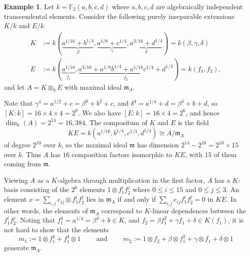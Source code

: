 \documentclass[11pt,reqno]{amsart}
\theoremstyle{definition}
\newtheorem{example}[lemma]{Example}
\theoremstyle{remark}
\theoremstyle{definition}
\theoremstyle{plain}
\newcommand{\F}{\mathbb{F}}
\newcommand{\m}{\mathfrak{m}}
\begin{document}
\begin{example}\label{ex:finally}
Let $k=\F_2(a,b,c,d)$ where $a,b,c,d$ are algebraically independent transcendental elements.
Consider the following purely inseparable extensions $K/k$ and $E/k$
\begin{align*}
  K&:=k(\underbrace{a^{1/16}+b^{1/4}}_\beta,\underbrace{a^{1/8}+c^{1/4}}_\gamma,\underbrace{a^{3/16}+d^{1/4}}_\delta) = k(\beta,\gamma,\delta)\\
  E&:=k(\underbrace{a^{1/16}}_{f_1},\underbrace{a^{3/16}+a^{1/8}b^{1/4}+a^{1/16}c^{1/4}+d^{1/4}}_{f_2}) = k(f_1,f_2),
\end{align*}
and let $A = K\otimes_k E$ with maximal ideal $\m_A$.

Note that $\gamma^4 = a^{1/2} + c = \beta^8+b^2+c$, and $\delta^4 = a^{1/4} + d = \beta^4 + b + d$, so $[K:k] = 16\times 4\times 4 = 2^8$.
We also have $[E:k]= 16\times 4 = 2^6$, and hence $\dim_k(A) = 2^{14} = 16,384$.
The compositum of $K$ and $E$ is the field 
$$
KE = k(a^{1/16},b^{1/4},c^{1/4},d^{1/4}) \cong A/\m_A
$$ 
of degree $2^{10}$ over $k$, so the maximal ideal $\m$ has dimension $2^{14} - 2^{10} = 2^{10}\times 15$ over $k$.
Thus $A$ has $16$ composition factors isomorphic to $KE$, with $15$ of them coming from $\m$.

Viewing $A$ as a $K$-algebra through multiplication in the first factor, $A$ has a $K$-basis consisting of
the $2^6$ elements $1\otimes f_1^if_2^j$ where $0\leq i\leq 15$ and $0\leq j\leq 3$.
An element $x = \sum_{i,j} e_{ij}\otimes f_1^if_2^j$ lies in $\m_A$ if and only if $\sum_{i,j} e_{ij}f_1^if_2^j = 0$ in $KE$.
In other words, the elements of $\m_A$ correspond to $K$-linear dependences between the $f_1^if_2^j$.
Noting that $f_1^4=a^{1/4}=\beta^4+b\in K$, and $f_2 = \beta f_1^2 + \gamma f_1 + \delta  \in K(f_1)$, it is not hard to show that the elements
$$
m_1:=1\otimes f_1^4+f_1^4\otimes 1 \qquad \textrm{ and } \qquad m_2:=1\otimes f_2 + \beta\otimes f_1^2+\gamma\otimes f_1+\delta\otimes 1
$$
generate $\m_A$.


\end{example}
\end{document}

